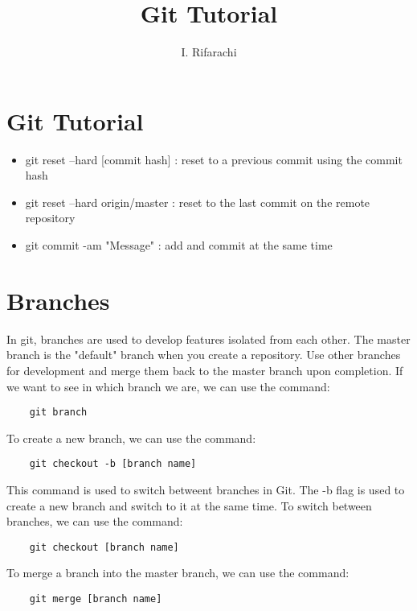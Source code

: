 \documentclass[12pt]{article}
\title{Git Tutorial}
\author{I. Rifarachi}
\begin{document}
\maketitle

\section{Git Tutorial}

\begin{itemize}
    \item git reset --hard [commit hash] : reset to a previous commit using the commit hash
    \item git reset --hard origin/master : reset to the last commit on the remote repository
    \item git commit -am "Message" : add and commit at the same time

\end{itemize}

\section{Branches}

In git, branches are used to develop features isolated from each other. The master branch is the "default" branch when you create a repository. Use other branches for development and merge them back to the master branch upon completion.
If we want to see in which branch we are, we can use the command:
\begin{verbatim}
    git branch
\end{verbatim}
To create a new branch, we can use the command:
\begin{verbatim}
    git checkout -b [branch name]
\end{verbatim}
This command is used to switch betweent branches in Git.
The -b flag is used to create a new branch and switch to it at the same time.
To switch between branches, we can use the command:
\begin{verbatim}
    git checkout [branch name]
\end{verbatim}
To merge a branch into the master branch, we can use the command:
\begin{verbatim}
    git merge [branch name]
\end{verbatim}
\end{document}
